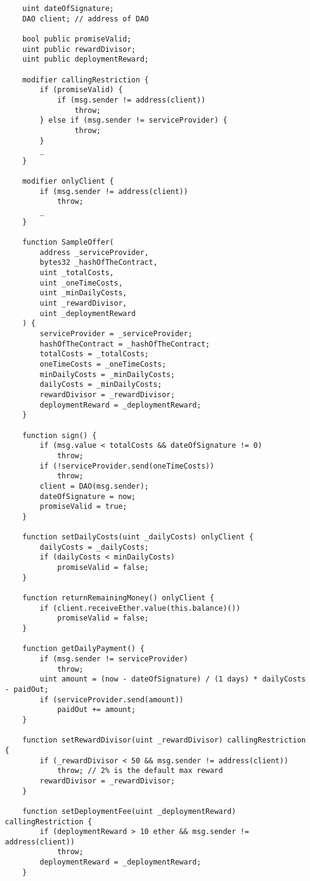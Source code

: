 \documentclass[9pt,oneside]{amsart}
\begin{document}
\begin{appendix}
\begin{verbatim}
    uint dateOfSignature;
    DAO client; // address of DAO

    bool public promiseValid;
    uint public rewardDivisor;
    uint public deploymentReward;

    modifier callingRestriction {
        if (promiseValid) {
            if (msg.sender != address(client))
                throw;
        } else if (msg.sender != serviceProvider) {
                throw;
        }
        _
    }

    modifier onlyClient {
        if (msg.sender != address(client))
            throw;
        _
    }

    function SampleOffer(
        address _serviceProvider,
        bytes32 _hashOfTheContract,
        uint _totalCosts,
        uint _oneTimeCosts,
        uint _minDailyCosts,
        uint _rewardDivisor,
        uint _deploymentReward
    ) {
        serviceProvider = _serviceProvider;
        hashOfTheContract = _hashOfTheContract;
        totalCosts = _totalCosts;
        oneTimeCosts = _oneTimeCosts;
        minDailyCosts = _minDailyCosts;
        dailyCosts = _minDailyCosts;
        rewardDivisor = _rewardDivisor;
        deploymentReward = _deploymentReward;
    }

    function sign() {
        if (msg.value < totalCosts && dateOfSignature != 0)
            throw;
        if (!serviceProvider.send(oneTimeCosts))
            throw;
        client = DAO(msg.sender);
        dateOfSignature = now;
        promiseValid = true;
    }

    function setDailyCosts(uint _dailyCosts) onlyClient {
        dailyCosts = _dailyCosts;
        if (dailyCosts < minDailyCosts)
            promiseValid = false;
    }

    function returnRemainingMoney() onlyClient {
        if (client.receiveEther.value(this.balance)())
            promiseValid = false;
    }

    function getDailyPayment() {
        if (msg.sender != serviceProvider)
            throw;
        uint amount = (now - dateOfSignature) / (1 days) * dailyCosts - paidOut;
        if (serviceProvider.send(amount))
            paidOut += amount;
    }

    function setRewardDivisor(uint _rewardDivisor) callingRestriction {
        if (_rewardDivisor < 50 && msg.sender != address(client))
            throw; // 2% is the default max reward
        rewardDivisor = _rewardDivisor;
    }

    function setDeploymentFee(uint _deploymentReward) callingRestriction {
        if (deploymentReward > 10 ether && msg.sender != address(client))
            throw; 
        deploymentReward = _deploymentReward;
    }


\end{verbatim}
\end{appendix}
\end{document}
